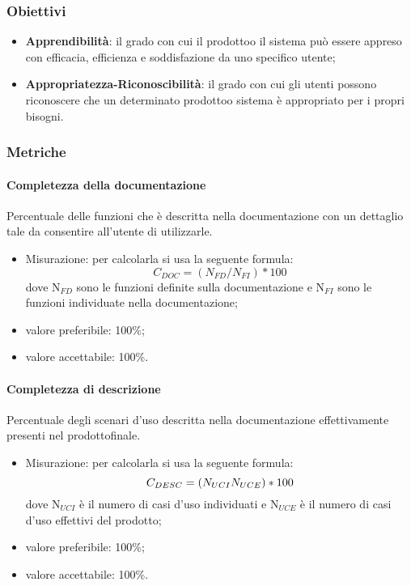         \subsubsection{Obiettivi}
            \begin{itemize}
                \item \textbf{Apprendibilità}: il grado con cui il prodotto\glosp o il sistema può essere appreso con efficacia, efficienza e soddisfazione da uno specifico utente;
                \item \textbf{Appropriatezza-Riconoscibilità}: il grado con cui gli utenti possono riconoscere che un determinato prodotto\glosp o sistema è appropriato per i propri bisogni.
            \end{itemize}
        \subsubsection{Metriche}
            \paragraph{Completezza della documentazione}
                Percentuale delle funzioni che è descritta nella documentazione con un dettaglio tale da consentire all’utente di utilizzarle.
                \begin{itemize}
                    \item Misurazione: per calcolarla si usa la seguente formula:
                    \[C_{DOC}=(N_{FD}/N_{FI})*100\]
                    dove N$_{FD}$ sono le funzioni definite sulla documentazione e N$_{FI}$ sono le funzioni individuate nella documentazione;
                    \item valore preferibile: 100\%;
                    \item valore accettabile: 100\%.
                \end{itemize}
            \paragraph{Completezza di descrizione}
                Percentuale degli scenari d’uso descritta nella documentazione effettivamente presenti nel prodotto\glosp finale.
                \begin{itemize}
                    \item Misurazione: per calcolarla si usa la seguente formula:
                    \[C_{DESC}=(N_{UCI}\\N_{UCE})*100\]
                    dove N$_{UCI}$ è il numero di casi d'uso individuati e N$_{UCE}$ è il numero di casi d'uso effettivi del prodotto\glo;
                    \item valore preferibile: 100\%;
                    \item valore accettabile: 100\%.
                \end{itemize}
